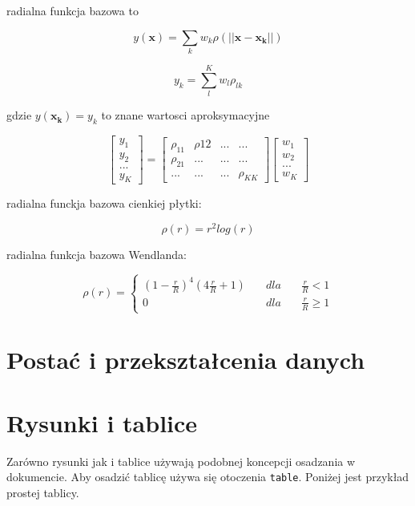 \documentclass[polish, twoside, 12pt, a4paper]{article}
\theoremstyle{definition}
\theoremstyle{plain}
\theoremstyle{remark}
\begin{document}
radialna funkcja bazowa to\;

\[
y(\boldsymbol{x})=\sum\limits_{k}{w_k\rho(||\boldsymbol{x-x_k}||)}
\]

\[
y_k=\sum\limits_{l}^{K}{w_l\rho_{lk}}
\]

gdzie \(y(\boldsymbol{x_k})=y_k\) to znane wartosci aproksymacyjne


\[
\begin{bmatrix}
y_1 \\ y_2 \\ ... \\ y_K
\end{bmatrix}
=
\begin{bmatrix}
\rho_{11} &  \rho{12} & ... & ... \\
\rho_{21} & ... & ... & ... \\
... & ... & ... & \rho_{KK} 
\end{bmatrix}
\begin{bmatrix}
w_1 \\ w_2 \\ ... \\ w_K
\end{bmatrix}
\]

radialna funckja bazowa cienkiej płytki:

\[
\rho(r) = r^2log(r)
\]

radialna funkcja bazowa Wendlanda:

\[
\rho(r) =
\left\{
\begin{aligned}
(1-\frac{r}{R})^4 (4 \frac{r}{R}+1) &\quad  dla  &\quad \frac{r}{R} < 1 \\
0 &\quad dla &\quad  \frac{r}{R} \geq 1
\end{aligned}
\right.
\]


\clearpage
\section{Postać i przekształcenia danych}






\clearpage

\clearpage
\section{Rysunki i tablice}

Zarówno rysunki jak i tablice używają podobnej koncepcji osadzania w dokumencie. Aby osadzić tablicę używa się otoczenia  \verb+table+. Poniżej jest przykład prostej tablicy.
\end{document}

